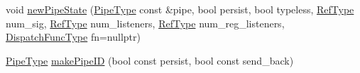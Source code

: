 \begin{DoxyCompactItemize}
\item 
void \hyperlink{structvt_1_1pipe_1_1_pipe_manager_base_a458f8135ed2a44ec51afb21676c5db50}{new\+Pipe\+State} (\hyperlink{namespacevt_ac9852acda74d1896f48f406cd72c7bd3}{Pipe\+Type} const \&pipe, bool persist, bool typeless, \hyperlink{namespacevt_a9b39ce9494bb04674d0d5b895a5aa50f}{Ref\+Type} num\+\_\+sig, \hyperlink{namespacevt_a9b39ce9494bb04674d0d5b895a5aa50f}{Ref\+Type} num\+\_\+listeners, \hyperlink{namespacevt_a9b39ce9494bb04674d0d5b895a5aa50f}{Ref\+Type} num\+\_\+reg\+\_\+listeners, \hyperlink{structvt_1_1pipe_1_1_pipe_manager_base_a983e301505317c5ba2041461e7dec84a}{Dispatch\+Func\+Type} fn=nullptr)
\item 
\hyperlink{namespacevt_ac9852acda74d1896f48f406cd72c7bd3}{Pipe\+Type} \hyperlink{structvt_1_1pipe_1_1_pipe_manager_base_af1ba11407837cb69b4d205dd7ba880b0}{make\+Pipe\+ID} (bool const persist, bool const send\+\_\+back)
\end{DoxyCompactItemize}
